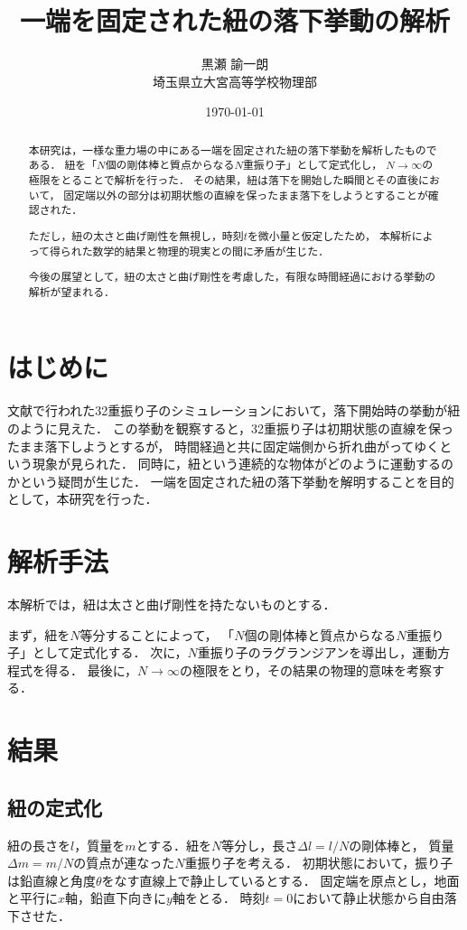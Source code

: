 \documentclass[11pt, a4paper]{ltjsarticle}
\title{一端を固定された紐の落下挙動の解析}
\author{黒瀬 諭一朗 \\ 埼玉県立大宮高等学校物理部}
\date{\today}
\begin{document}
\maketitle

\begin{abstract}
本研究は，一様な重力場の中にある一端を固定された紐の落下挙動を解析したものである．
紐を「$N$個の剛体棒と質点からなる$N$重振り子」として定式化し，
$N\rightarrow\infty$の極限をとることで解析を行った．
その結果，紐は落下を開始した瞬間とその直後において，
固定端以外の部分は初期状態の直線を保ったまま落下をしようとすることが確認された．

ただし，紐の太さと曲げ剛性を無視し，時刻$t$を微小量と仮定したため，
本解析によって得られた数学的結果と物理的現実との間に矛盾が生じた．

今後の展望として，紐の太さと曲げ剛性を考慮した，有限な時間経過における挙動の解析が望まれる．
\end{abstract}

\section{はじめに}
文献\cite{ref:web1}で行われた32重振り子のシミュレーションにおいて，落下開始時の挙動が紐のように見えた．
この挙動を観察すると，32重振り子は初期状態の直線を保ったまま落下しようとするが，
時間経過と共に固定端側から折れ曲がってゆくという現象が見られた．
同時に，紐という連続的な物体がどのように運動するのかという疑問が生じた．
一端を固定された紐の落下挙動を解明することを目的として，本研究を行った．

\section{解析手法}
本解析では，紐は太さと曲げ剛性を持たないものとする．

まず，紐を$N$等分することによって，
「$N$個の剛体棒と質点からなる$N$重振り子」として定式化する．
次に，$N$重振り子のラグランジアンを導出し，運動方程式を得る．
最後に，$N\rightarrow\infty$の極限をとり，その結果の物理的意味を考察する．

\section{結果}
\subsection{紐の定式化}
紐の長さを$l$，質量を$m$とする．紐を$N$等分し，長さ$\varDelta l = l/N$の剛体棒と，
質量$\varDelta m = m/N$の質点が連なった$N$重振り子を考える．
初期状態において，振り子は鉛直線と角度$\theta$をなす直線上で静止しているとする．
固定端を原点とし，地面と平行に$x$軸，鉛直下向きに$y$軸をとる．
時刻$t = 0$において静止状態から自由落下させた．
\end{document}
